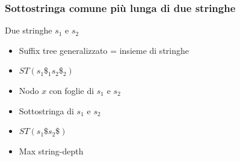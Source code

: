 \begin{frame}[fragile]
\begin{columns}
\begin{column}{0.5\textwidth}
\begin{center}
\end{center}
\end{column}
\end{columns}
\end{frame}

\begin{frame}[fragile]
\frametitle{Sottostringa comune più lunga di due stringhe}
\begin{block}{Due stringhe $s_{1}$ e $s_{2}$}
\begin{itemize}[<+->]
\item
Suffix tree generalizzato = insieme di stringhe
\item
$ST(s_{1}\$_{1}s_{2}\$_{2})$
\item
Nodo $x$ con foglie di $s_{1}$ e $s_{2}$
\item
Sottostringa di $s_{1}$ e $s_{2}$
\item
$ST(s_{1}\$s_{2}\$)$
\item
Max string-depth
\end{itemize}
\end{block}
\end{frame}



